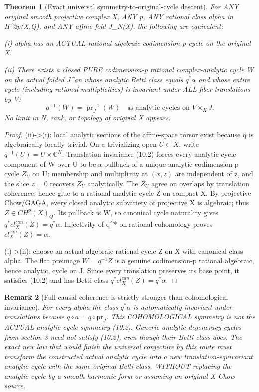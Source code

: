 \documentclass[11pt]{article}
\newtheorem{theorem}{Theorem}[section]
\newtheorem{remark}[theorem]{Remark}
\begin{document}
\begin{theorem}[Exact universal symmetry-to-original-cycle descent]
For ANY original smooth projective
complex X, ANY p, ANY rational
class alpha in H^{2p}(X,Q),
and ANY affine fold J_N(X),
the following are equivalent:

(i) alpha has an ACTUAL rational
algebraic codimension-p cycle on
the original X.

(ii) There exists a
closed PURE codimension-p
rational complex-analytic cycle
W on the actual folded J^{an}
whose analytic Betti class equals
$q^*\alpha$ and whose entire
cycle (including rational
multiplicities) is invariant under
ALL fiber translations by V:
\[
 \boxed{
  a^{-1}(W)=
  \operatorname{pr}_J^{-1}(W)
       \quad\text{as analytic cycles
                  on }V\times_X J.
 }                                                        \tag{10.2}
\]
No limit in N, rank, or topology
of original X appears.
\end{theorem}
\begin{proof}
(ii)->(i): local analytic sections
of the affine-space torsor exist
because q is algebraically locally
trivial. On a trivializing open
$U\subset X$, write $q^{-1}(U)
=U\times\mathbb C^N$.
Translation invariance (10.2)
forces every analytic-cycle
component of W over U to be
a pullback of a unique analytic
codimension-p cycle $Z_U$ on U:
membership and multiplicity at
$(x,z)$ are independent of z,
and the slice $z=0$ recovers
$Z_U$ analytically. The
$Z_U$ agree on overlaps by
translation coherence, hence
glue to a rational analytic
cycle Z on compact X.
By projective Chow/GAGA,
every closed analytic subvariety
of projective X is algebraic;
thus $Z\in CH^p(X)_Q$.
Its pullback is W, so canonical
cycle naturality gives
$q^*cl_X^{can}(Z)=q^*\alpha$.
Injectivity of q^* on rational
cohomology proves
$cl_X^{can}(Z)=\alpha$.

(i)->(ii): choose an actual
algebraic rational cycle Z on
X with canonical class alpha.
The flat preimage $W=q^{-1}Z$
is a genuine codimension-p
rational algebraic, hence
analytic, cycle on J.
Since every translation preserves
its base point, it satisfies
(10.2) and has Betti class
$q^*cl_X^{can}(Z)=q^*\alpha$.
\end{proof}

\begin{remark}[Full causal coherence is strictly stronger than cohomological invariance]
For every alpha the class
$q^*\alpha$ is automatically
invariant under translations
because $q\circ a=q\circ
\mathrm{pr}_J$. This
COHOMOLOGICAL symmetry is not
the ACTUAL analytic-cycle
symmetry (10.2). Generic
analytic degeneracy cycles from
section 3 need not satisfy
(10.2), even though their
Betti class does. The exact
new law that would finish the
universal conjecture by this
route must transform the
constructed \emph{actual analytic
cycle} into a new
translation-equivariant analytic
cycle with the same original
Betti class, WITHOUT replacing
the analytic cycle by a smooth
harmonic form or assuming an
original-X Chow source.
\end{remark}
\end{document}
